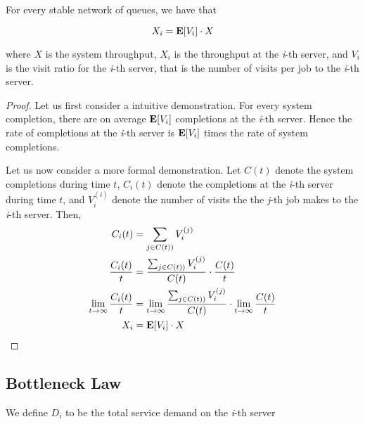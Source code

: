 \begin{theorem}
\label{thm:Forced-Flow-Law}	
	For every stable network of queues, we have that
	
	\begin{equation}
	\label{eqn-Forced-Flow-Law}
	X_{i} = \expected{V_{i}} \cdot X
	\end{equation}
	
	where 
	$X$ is the system throughput,
	$X_{i}$ is the throughput at the \textit{i}-th server, and
	$V_{i}$ is the visit ratio for the \textit{i}-th server, that is the number of visits per job to the \textit{i}-th server.
	
	\begin{proof}
		Let us first consider a intuitive demonstration.
		For every system completion, there are on average $\mathbf{E}[V_{i}]$ completions at the \textit{i}-th server. Hence the rate of completions at the \textit{i}-th server is $\mathbf{E}[V_{i}]$ times the rate of system completions.
		
		Let us now consider a more formal demonstration.
		Let $C(t)$ denote the system completions during time $t$, $C_{i}(t)$ denote the completions at the \textit{i}-th server during time $t$, and $V_{i}^{(i)}$ denote the number of visits the the \textit{j}-th job makes to the \textit{i}-th server. Then,
		\begin{equation*}
			\begin{split}
				C_{i}(t) & = \sum_{j \in C(t))}V_{i}^{(j)} \\
				\frac{C_{i}(t)}{t} & = \frac{\sum_{j \in C(t))}V_{i}^{(j)} }{C(t)} \cdot \frac{C(t)}{t} \\
				\lim_{t \to \infty} \frac{C_{i}(t)}{t} & = \lim_{t \to \infty} \frac{\sum_{j \in C(t))}V_{i}^{(j)} }{C(t)} \cdot \lim_{t \to \infty} \frac{C(t)}{t} \\
				X_{i} & = \mathbf{E}[V_{i}] \cdot X
			\end{split}
		\end{equation*}
	\end{proof}
\end{theorem}




\subsection{Bottleneck Law}
\label{sec:Bottleneck-Law}

We define $D_{i}$ to be the total service demand on the \textit{i}-th server

